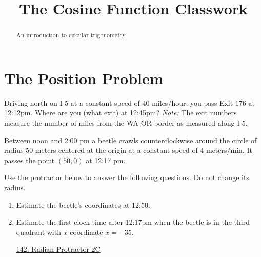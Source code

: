 \documentclass{ximera}
\title{The Cosine Function Classwork}
\begin{document}
\begin{abstract}
An introduction to circular trigonometry.
\end{abstract}
\maketitle


\section{The Position Problem}

\begin{question} \label{Q9df33f}
Driving north on I-5 at a constant speed of $40$ miles/hour, you pass Exit 176 at 12:12pm. Where are you (what exit) at 12:45pm? \emph{Note:} The exit numbers measure the number of miles from the WA-OR border as measured along I-5.
\end{question}

\begin{question}  \label{Q9dfedferyghnfetf4}

Between noon and 2:00 pm a beetle crawls counterclockwise around the circle of radius $50$ meters centered at the origin at a constant speed of $4$ meters/min. It passes the point $(50,0)$ at 12:17 pm.

Use the protractor below to answer the following questions. Do not change its radius.
\begin{enumerate}

\item Estimate the beetle's coordinates at 12:50. 

\item Estimate the first clock time after 12:17pm when the beetle is in the third quadrant with $x$-coordinate $x=-35$.

\begin{onlineOnly}
    \begin{center}
\end{center}
\end{onlineOnly}

\href{https://www.desmos.com/calculator/lbkveixdno}{142: Radian Protractor 2C}

\end{enumerate}
\end{question}
\end{document}
